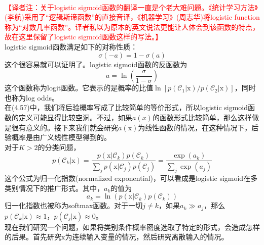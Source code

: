 \documentclass[b5paper]{book}
\numberwithin{equation}{chapter}
\newcommand {\bx} {\boldsymbol{\mathrm{x}}}
\newcommand {\calC} {\mathcal{C}}
\begin{document}
{\begin{figure}[ht]
		\label{fig:4-9}
	\end{figure}
	\\
	\textcolor{red}{【译者注：关于logistic sigmoid函数的翻译一直是个老大难问题。《统计学习方法》(李航)采用了“逻辑斯谛函数”的直接音译，《机器学习》(周志华)将logistic function称为“对数几率函数”。译者私以为原本的英文说法更能让人体会到该函数的特点，故在这里保留了logistic sigmoid函数这样的写法。】}\\
	\indent logistic sigmoid函数满足如下的对称性质：
	\begin{equation}
		\sigma(-a) = 1 - \sigma(a)
	\end{equation}
	这个很容易就可以证明了。logistic sigmoid函数的反函数为
	\begin{equation}
		a = \ln \left(\frac{\sigma}{1-\sigma}\right)
	\end{equation}
	这个函数称为logit函数。它表示的是概率的比值$\ln [p(\calC_1|\bx)/p(\calC_2|\bx)]$，同时也称为log odds。\\
	\indent 在(4.57)中，我们将后验概率写成了比较简单的等价形式，所以logistic sigmoid函数的定义可能显得比较空洞。不过，如果$a(x)$的函数形式比较简单，那么这样做是很有意义的。接下来我们就会研究$a(\bx)$为线性函数的情况，在这种情况下，后验概率是由广义线性模型得到的。\\
	\indent 对于$K>2$的分类问题，
	\begin{equation}
		p(\calC_k|\bx) = \frac{p(\bx|\calC_k)p(\calC_k)}{\sum_j p(\bx|\calC_j)p(\calC_j)} = \frac{\exp(a_k)}{\sum_j \exp(a_j)}
	\end{equation}
	这个公式为归一化指数(normalized exponential)，可以看成是logistic sigmoid在多类别情况下的推广形式。其中，$a_k$的值为
	\begin{equation}
		a_k = \ln(p(\bx|\calC_k)p(\calC_k))
	\end{equation}
	归一化指数也被称为softmax函数。对于一切$j \neq k$，如果$a_k \gg a_j$，那么$p(\calC_k|\bx) \approx 1$，$p(\calC_j|\bx) \approx 0$。\\
	\indent 现在我们研究一个问题，如果将类别条件概率密度选取了特定的形式，会造成怎样的后果。首先研究$\bx$为连续输入变量的情况，然后研究离散输入的情况。
	}
\end{document}
